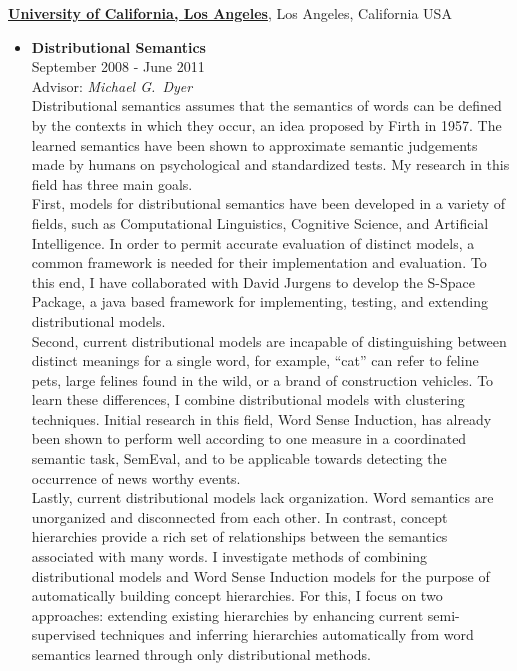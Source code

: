 \documentclass[10pt]{article}
\newenvironment{outerlist}[1][\enskip\textbullet]%
        {\begin{itemize}[#1,leftmargin=*]}{\end{itemize}%
         \vspace{-.6\baselineskip}}
\begin{document}
\href{http://www.cs.ucla.edu/}{\textbf{University of California, Los Angeles}},
Los Angeles, California USA
\begin{outerlist}

\item[] \textbf{Distributional Semantics} \\
        September 2008 - June 2011 \\
        Advisor: \textit{Michael G.~Dyer} \\

        Distributional semantics assumes that the semantics of words can be
        defined by the contexts in which they occur, an idea proposed by Firth
        in 1957. The learned semantics have been shown to approximate semantic
        judgements made by humans on psychological and standardized tests. My
        research in this field has three main goals. \\

        First, models for distributional semantics have been developed in a
        variety of fields, such as Computational Linguistics, Cognitive Science,
        and Artificial Intelligence. In order to permit accurate evaluation of
        distinct models, a common framework is needed for their implementation
        and evaluation. To this end, I have collaborated with David Jurgens to
        develop the S-Space Package, a java based framework for implementing,
        testing, and extending distributional models. \\

        Second, current distributional models are incapable of distinguishing
        between distinct meanings for a single word, for example, “cat” can
        refer to feline pets, large felines found in the wild, or a brand of
        construction vehicles. To learn these differences, I combine
        distributional models with clustering techniques. Initial research in
        this field, Word Sense Induction, has already been shown
        to perform well according to one measure in a coordinated semantic task,
        SemEval, and to be applicable towards detecting the occurrence of news
        worthy events. \\

        Lastly, current distributional models lack organization. Word semantics
        are unorganized and disconnected from each other. In contrast, concept
        hierarchies provide a rich set of relationships between the semantics
        associated with many words. I investigate methods of combining
        distributional models and Word Sense Induction models for the purpose of
        automatically building concept hierarchies. For this, I focus on two
        approaches: extending existing hierarchies by enhancing current
        semi-supervised techniques and inferring hierarchies automatically
        from word semantics learned through only distributional methods.

\end{outerlist}
\end{document}
